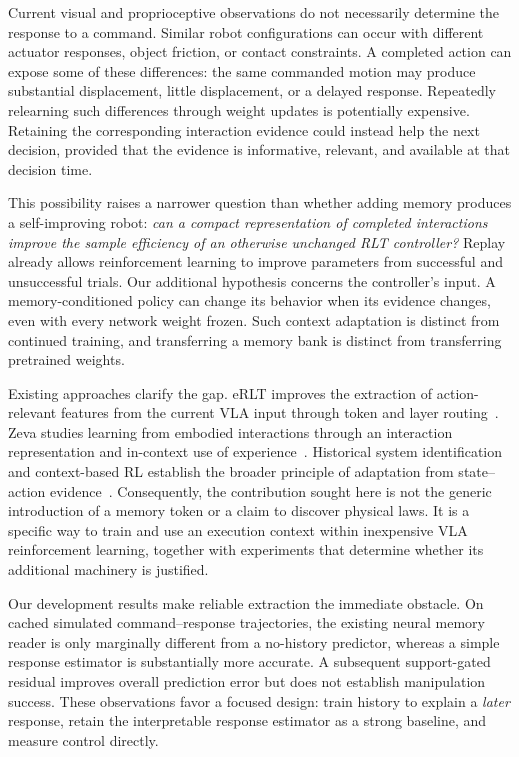 \documentclass[10pt,letterpaper]{article}
\begin{document}
Current visual and proprioceptive observations do not necessarily determine the response to a command. Similar robot configurations can occur with different actuator responses, object friction, or contact constraints. A completed action can expose some of these differences: the same commanded motion may produce substantial displacement, little displacement, or a delayed response. Repeatedly relearning such differences through weight updates is potentially expensive. Retaining the corresponding interaction evidence could instead help the next decision, provided that the evidence is informative, relevant, and available at that decision time.

This possibility raises a narrower question than whether adding memory produces a self-improving robot: \emph{can a compact representation of completed interactions improve the sample efficiency of an otherwise unchanged RLT controller?} Replay already allows reinforcement learning to improve parameters from successful and unsuccessful trials. Our additional hypothesis concerns the controller's input. A memory-conditioned policy can change its behavior when its evidence changes, even with every network weight frozen. Such context adaptation is distinct from continued training, and transferring a memory bank is distinct from transferring pretrained weights.

Existing approaches clarify the gap. eRLT improves the extraction of action-relevant features from the current VLA input through token and layer routing~\citep{erlt}. Zeva studies learning from embodied interactions through an interaction representation and in-context use of experience~\citep{zeva}. Historical system identification and context-based RL establish the broader principle of adaptation from state--action evidence~\citep{uposi,rma,pearl}. Consequently, the contribution sought here is not the generic introduction of a memory token or a claim to discover physical laws. It is a specific way to train and use an execution context within inexpensive VLA reinforcement learning, together with experiments that determine whether its additional machinery is justified.

Our development results make reliable extraction the immediate obstacle. On cached simulated command--response trajectories, the existing neural memory reader is only marginally different from a no-history predictor, whereas a simple response estimator is substantially more accurate. A subsequent support-gated residual improves overall prediction error but does not establish manipulation success. These observations favor a focused design: train history to explain a \emph{later} response, retain the interpretable response estimator as a strong baseline, and measure control directly.
\end{document}
